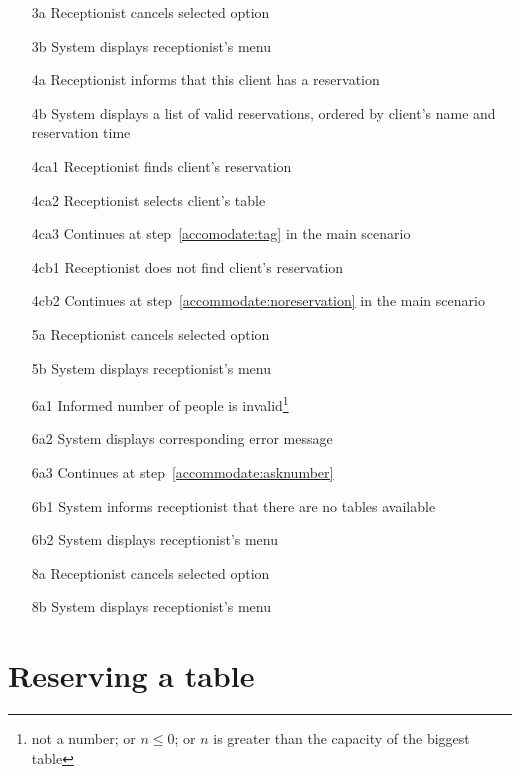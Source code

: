 \documentclass[a4paper,11pt,oneside]{book}
\begin{document}
\begin{enumerate}
\item [3a] Receptionist cancels selected option
\item [3b] System displays receptionist's menu
\\
\item [4a] Receptionist informs that this client has a reservation
\item [4b] System displays a list of valid reservations, ordered by client's name and reservation time
\\
\item [4ca1] Receptionist finds client's reservation
\item [4ca2] Receptionist selects client's table
\item [4ca3] Continues at step~\ref{accomodate:tag} in the main scenario
\\
\item [4cb1] Receptionist does not find client's reservation
\item [4cb2] Continues at step~\ref{accommodate:noreservation} in the main scenario
\\
\item [5a] Receptionist cancels selected option
\item [5b] System displays receptionist's menu
\\
\item [6a1] Informed number of people is invalid\footnote{not a number; or $n \leq 0$; or $n$ is greater than the capacity of the biggest table}
\item [6a2] System displays corresponding error message
\item [6a3] Continues at step~\ref{accommodate:asknumber}
\\
\item [6b1] System informs receptionist that there are no tables available
\item [6b2] System displays receptionist's menu
\\
\item [8a] Receptionist cancels selected option
\item [8b] System displays receptionist's menu
\\
\end{enumerate}

\chapter{Reserving a table}
\end{document}
